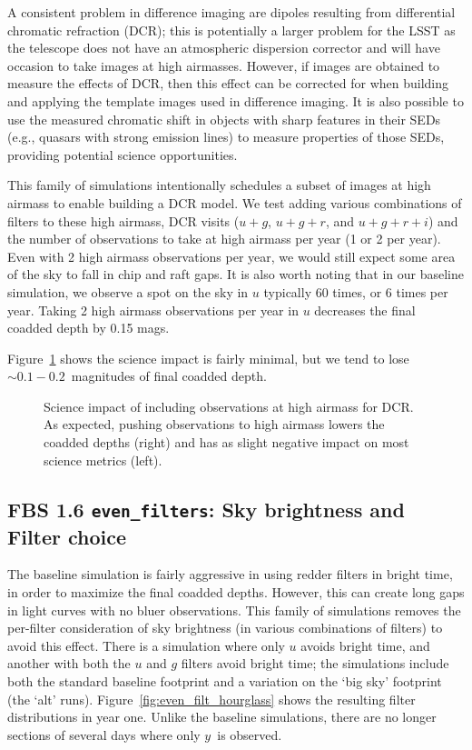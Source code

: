A consistent problem in difference imaging are dipoles resulting from differential chromatic refraction (DCR); this is potentially a larger problem for the LSST as the telescope does not have an atmospheric dispersion corrector and will have occasion to take images at high airmasses. However, if images are obtained to measure the effects of DCR, then this effect can be corrected for when building and applying the template images used in difference imaging. It is also possible to use the measured chromatic shift in objects with sharp features in their SEDs (e.g., quasars with strong emission lines) to measure properties of those SEDs, providing potential science opportunities. 

This family of simulations intentionally schedules a subset of images at high airmass to enable building a DCR model. We test adding various combinations of filters to these high airmass, DCR visits ($u+g$, $u+g+r$, and $u+g+r+i$) and the number of observations to take at high airmass per year (1 or 2 per year).  Even with 2 high airmass observations per year, we would still expect some area of the sky to fall in chip and raft gaps.  It is also worth noting that in our baseline simulation, we observe a spot on the sky in $u$ typically 60 times, or 6 times per year. Taking 2 high airmass observations per year in $u$ decreases the final coadded depth by 0.15 mags.

Figure~\ref{fig:dcr_radar} shows the science impact is fairly minimal, but we tend to lose $\sim0.1-0.2$\ magnitudes of final coadded depth.

\begin{figure}
\caption{Science impact of including observations at high airmass for DCR. As expected, pushing observations to high airmass lowers the coadded depths (right) and has as slight negative impact on most science metrics (left).}\label{fig:dcr_radar}
\end{figure}


\subsection{FBS 1.6 {\tt even\_filters}: Sky brightness and Filter choice}\label{ss:evenfilters}

The baseline simulation is fairly aggressive in using redder filters in bright time, in order to maximize the final coadded depths. However, this can create long gaps in light curves with no bluer observations. This family of simulations removes the per-filter consideration of sky brightness (in various combinations of filters) to avoid this effect. There is a simulation where only $u$ avoids bright time, and another with both the $u$ and $g$ filters avoid bright time; the simulations include both the standard baseline footprint and a variation on the `big sky' footprint (the `alt' runs). Figure~\ref{fig:even_filt_hourglass} shows the resulting filter distributions in year one. Unlike the baseline simulations, there are no longer sections of several days where only $y$\ is observed.

